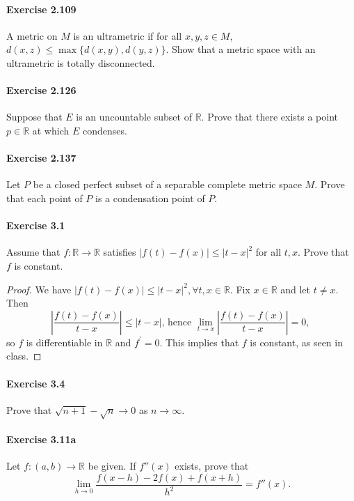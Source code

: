 \documentclass{article}
\begin{document}
\paragraph{Exercise 2.109} A metric on $M$ is an ultrametric if for all $x, y, z \in M$, $d(x, z) \leq \max \{d(x, y), d(y, z)\} .$ Show that a metric space with an ultrametric is totally disconnected.


\paragraph{Exercise 2.126} Suppose that $E$ is an uncountable subset of $\mathbb{R}$. Prove that there exists a point $p \in \mathbb{R}$ at which $E$ condenses.


\paragraph{Exercise 2.137} Let $P$ be a closed perfect subset of a separable complete metric space $M$. Prove that each point of $P$ is a condensation point of $P$.


\paragraph{Exercise 3.1} Assume that $f \colon \mathbb{R} \rightarrow \mathbb{R}$ satisfies $|f(t)-f(x)| \leq|t-x|^{2}$ for all $t, x$. Prove that $f$ is constant.
\begin{proof}
    We have $|f(t)-f(x)| \leq|t-x|^2, \forall t, x \in \mathbb{R}$. Fix $x \in \mathbb{R}$ and let $t \neq x$. Then
$$
\left|\frac{f(t)-f(x)}{t-x}\right| \leq|t-x| \text {, hence } \lim _{t \rightarrow x}\left|\frac{f(t)-f(x)}{t-x}\right|=0 \text {, }
$$
so $f$ is differentiable in $\mathbb{R}$ and $f^{\prime}=0$. This implies that $f$ is constant, as seen in class.
\end{proof}



\paragraph{Exercise 3.4} Prove that $\sqrt{n+1}-\sqrt{n} \rightarrow 0$ as $n \rightarrow \infty$.


\paragraph{Exercise 3.11a} Let $f \colon (a, b) \rightarrow \mathbb{R}$ be given.  If $f''(x)$ exists, prove that \[\lim_{h \rightarrow 0} \frac{f(x - h) - 2f(x) + f(x + h)}{h^2} = f''(x).\]
\end{document}
